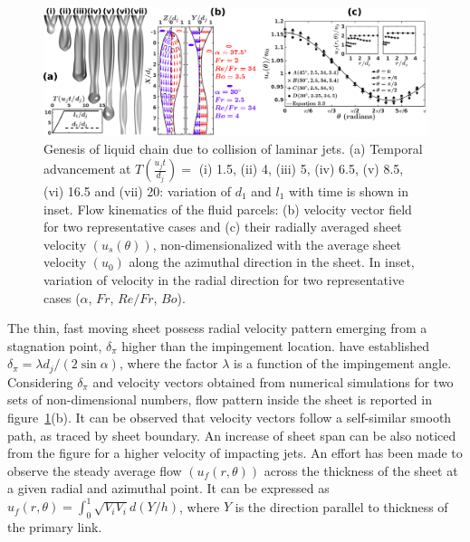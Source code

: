 \documentclass{jfm}
\begin{document}
\begin{figure}
	\centering
	\includegraphics[width=\linewidth]{Figure3}
	\caption{Genesis of liquid chain due to collision of laminar jets. (a) Temporal advancement at $T(\frac{u_jt}{d_j}) = $ (i) 1.5, (ii) 4, (iii) 5, (iv) 6.5, (v) 8.5, (vi) 16.5 and (vii) 20: variation of $d_1$ and $l_1$ with time is shown in inset. Flow kinematics of the fluid parcels: (b) velocity vector field for two representative cases and (c) their radially averaged sheet velocity $\left(u_s(\theta)\right)$, non-dimensionalized with the average sheet velocity $\left(u_0\right)$ along the azimuthal direction in the sheet. In inset, variation of velocity in the radial direction for two representative cases ($\alpha$, $Fr$, $Re/Fr$, $Bo$).}
	\label{Figure::GenesisNvelo}%
\end{figure}
The thin, fast moving sheet possess radial velocity pattern emerging from a stagnation point, $\delta_\pi$ higher than the impingement location. \cite{inamura2014effect} have established $\delta_\pi = \lambda d_j/(2\sin\alpha)$, where the factor $\lambda$ is a function of the impingement angle. Considering $\delta_\pi$ and velocity vectors obtained from numerical simulations for two sets of non-dimensional numbers, flow pattern inside the sheet is reported in figure~\ref{Figure::GenesisNvelo}(b). It can be observed that velocity vectors follow a self-similar smooth path, as traced by sheet boundary. An increase of sheet span can be also noticed from the figure for a higher velocity of impacting jets.  
An effort has been made to observe the steady average flow $\left(u_f(r,\theta)\right)$ across the thickness of the sheet at a given radial and azimuthal point. It can be expressed %
as $u_f(r,\theta) = \int_{0}^{1}\sqrt{V_iV_i}d(Y/h)$, where $Y$ is the direction parallel to thickness of the primary link.
\end{document}
